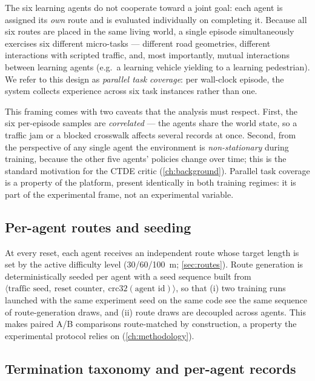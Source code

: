 The six learning agents do not cooperate toward a joint goal: each agent is
assigned its \emph{own} route and is evaluated individually on completing
it. Because all six routes are placed in the same living world, a single
episode simultaneously exercises six different micro-tasks --- different
road geometries, different interactions with scripted traffic, and, most
importantly, mutual interactions between learning agents (e.g.\ a learning
vehicle yielding to a learning pedestrian). We refer to this design as
\emph{parallel task coverage}: per wall-clock episode, the system collects
experience across six task instances rather than one.

This framing comes with two caveats that the analysis must respect. First,
the six per-episode samples are \emph{correlated} --- the agents share the
world state, so a traffic jam or a blocked crosswalk affects several
records at once. Second, from the perspective of any single agent the
environment is \emph{non-stationary} during training, because the other
five agents' policies change over time; this is the standard motivation for
the CTDE critic (\cref{ch:background}). Parallel task coverage is a
property of the platform, present identically in both training regimes: it
is part of the experimental frame, not an experimental variable.

\subsection{Per-agent routes and seeding}
\label{sec:seeding}

At every reset, each agent receives an independent route whose target
length is set by the active difficulty level (30/60/\SI{100}{m};
\cref{sec:routes}). Route generation is deterministically seeded per agent
with a seed sequence built from
$\langle\text{traffic seed},\ \text{reset counter},\ \mathrm{crc32}(\text{agent
id})\rangle$, so that (i) two training runs launched with the same
experiment seed on the same code see the same sequence of route-generation
draws, and (ii) route draws are decoupled across agents. This makes paired
A/B comparisons route-matched by construction, a property the experimental
protocol relies on (\cref{ch:methodology}).

\subsection{Termination taxonomy and per-agent records}
\label{sec:termination}

